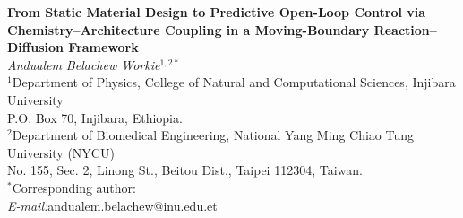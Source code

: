 \documentclass[11pt]{article}
\begin{document}
\begin{center}
{\bfseries From Static Material Design to Predictive Open-Loop Control via Chemistry--Architecture Coupling in a Moving-Boundary Reaction--Diffusion Framework}\\[0.9em]

{\large\textit{Andualem Belachew Workie}$^{1,2*}$}\\[0.5em]

{\small $^{1}$Department of Physics, College of Natural and Computational Sciences, Injibara University \\ 
P.O. Box 70, Injibara, Ethiopia.}\\[0.3em]

{\small $^{2}$Department of Biomedical Engineering, National Yang Ming Chiao Tung University (NYCU) \\ 
No. 155, Sec. 2, Linong St., Beitou Dist., Taipei 112304, Taiwan.}\\[0.5em]

{\small $^{*}$Corresponding author:}\\[0.2em]
{\small \emph{E-mail:}andualem.belachew@inu.edu.et}\\[0.3em]
\end{center}

\vspace{0.6em}
\end{document}

